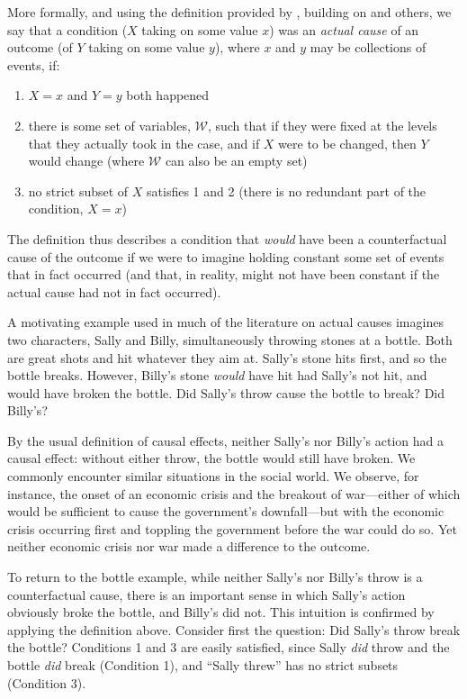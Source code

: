 \documentclass[
  12pt,
]{book}
\providecommand{\tightlist}{%
  \setlength{\itemsep}{0pt}\setlength{\parskip}{0pt}}
\begin{document}
More formally, and using the definition provided by \citep{halpern2015modification}, building on \citep{halpern2005causesa} and others, we say that a condition (\(X\) taking on some value \(x\)) was an \emph{actual cause} of an outcome (of \(Y\) taking on some value \(y\)), where \(x\) and \(y\) may be collections of events, if:

\begin{enumerate}
\def\labelenumi{\arabic{enumi}.}
\tightlist
\item
  \(X=x\) and \(Y=y\) both happened
\item
  there is some set of variables, \(\mathcal W\), such that if they were fixed at the levels that they actually took in the case, and if \(X\) were to be changed, then \(Y\) would change (where \(\mathcal W\) can also be an empty set)
\item
  no strict subset of \(X\) satisfies 1 and 2 (there is no redundant part of the condition, \(X=x\))
\end{enumerate}

The definition thus describes a condition that \emph{would} have been a counterfactual cause of the outcome if we were to imagine holding constant some set of events that in fact occurred (and that, in reality, might not have been constant if the actual cause had not in fact occurred).

A motivating example used in much of the literature on actual causes \citep[e.g.~][]{hall2004two} imagines two characters, Sally and Billy, simultaneously throwing stones at a bottle. Both are great shots and hit whatever they aim at. Sally's stone hits first, and so the bottle breaks. However, Billy's stone \emph{would} have hit had Sally's not hit, and would have broken the bottle. Did Sally's throw cause the bottle to break? Did Billy's?

By the usual definition of causal effects, neither Sally's nor Billy's action had a causal effect: without either throw, the bottle would still have broken. We commonly encounter similar situations in the social world. We observe, for instance, the onset of an economic crisis and the breakout of war---either of which would be sufficient to cause the government's downfall---but with the economic crisis occurring first and toppling the government before the war could do so. Yet neither economic crisis nor war made a difference to the outcome.

To return to the bottle example, while neither Sally's nor Billy's throw is a counterfactual cause, there is an important sense in which Sally's action obviously broke the bottle, and Billy's did not. This intuition is confirmed by applying the definition above. Consider first the question: Did Sally's throw break the bottle? Conditions 1 and 3 are easily satisfied, since Sally \emph{did} throw and the bottle \emph{did} break (Condition 1), and ``Sally threw'' has no strict subsets (Condition 3).
\end{document}

